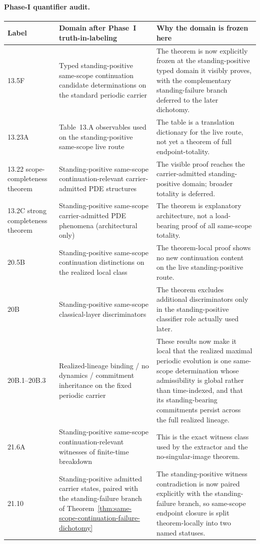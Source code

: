 \paragraph{Phase-I quantifier audit.}
\begin{center}
\footnotesize
\renewcommand{\arraystretch}{1.14}
\setlength{\tabcolsep}{4pt}
\begin{tabularx}{0.98\textwidth}{@{}L{0.15\textwidth}L{0.33\textwidth}Y@{}}
\toprule
\textbf{Label} & \textbf{Domain after Phase~I truth-in-labeling} & \textbf{Why the domain is frozen here}\\
\midrule
13.5F & Typed standing-positive same-scope continuation candidate determinations on the standard periodic carrier & The theorem is now explicitly frozen at the standing-positive typed domain it visibly proves, with the complementary standing-failure branch deferred to the later dichotomy.\\
13.23A & Table~13.A observables used on the standing-positive same-scope live route & The table is a translation dictionary for the live route, not yet a theorem of full endpoint-totality.\\
13.22 scope-completeness theorem & Standing-positive same-scope continuation-relevant carrier-admitted PDE structures & The visible proof reaches the carrier-admitted standing-positive domain; broader totality is deferred.\\
13.2C strong completeness theorem & Standing-positive same-scope carrier-admitted PDE phenomena (architectural only) & The theorem is explanatory architecture, not a load-bearing proof of all same-scope totality.\\
20.5B & Standing-positive same-scope continuation distinctions on the realized local class & The theorem-local proof shows no new continuation content on the live standing-positive route.\\
20B & Standing-positive same-scope classical-layer discriminators & The theorem excludes additional discriminators only in the standing-positive classifier role actually used later.\\
20B.1--20B.3 & Realized-lineage binding / no dynamics / commitment inheritance on the fixed periodic carrier & These results now make it local that the realized maximal periodic evolution is one same-scope determination whose admissibility is global rather than time-indexed, and that its standing-bearing commitments persist across the full realized lineage.\\
21.6A & Standing-positive same-scope continuation-relevant witnesses of finite-time breakdown & This is the exact witness class used by the extractor and the no-singular-image theorem.\\
21.10 & Standing-positive admitted carrier states, paired with the standing-failure branch of Theorem~\ref{thm:same-scope-continuation-failure-dichotomy} & The standing-positive witness contradiction is now paired explicitly with the standing-failure branch, so same-scope endpoint closure is split theorem-locally into two named statuses.\\
\bottomrule
\end{tabularx}
\end{center}

